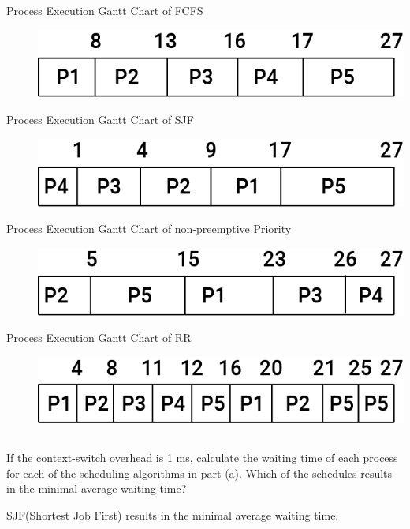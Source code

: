 \documentclass{article}
\begin{document}
\begin{description}
    \item[Process Execution Gantt Chart of FCFS] \hfill 
    
    
    \includegraphics[width=1\linewidth]{./fcfs.png}
    \item[Process Execution Gantt Chart of SJF] \hfill 
    
    
    \includegraphics[width=1\linewidth]{./sjf.png}
    \item[Process Execution Gantt Chart of non-preemptive Priority] \hfill 
    
    
    \includegraphics[width=1\linewidth]{./priority.png}
    \item[Process Execution Gantt Chart of RR] \hfill 
    
    
    \includegraphics[width=1\linewidth]{./rr.png}
\end{description}

\subsection{} If the context-switch overhead is 1 ms, calculate the waiting time of each process for
each of the scheduling algorithms in part (a). Which of the schedules results in the minimal
average waiting time? 

SJF(Shortest Job First) results in the minimal average waiting time.\\ \\
\end{document}
